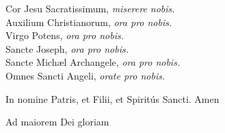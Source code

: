 \documentclass[9pt, twoside]{book}
\begin{document}
\noindent Cor Jesu Sacratissimum, \textit{miserere nobis.}\\
Auxilium Christianorum, \textit{ora pro nobis.}\\
Virgo Potens, \textit{ora pro nobis.}\\
Sancte Joseph, \textit{ora pro nobis.}\\
Sancte Michæl Archangele, \textit{ora pro nobis.}\\
Omnes Sancti Angeli, \textit{orate pro nobis.}

\noindent In nomine Patris, \cross et Filii, et Spiritús Sancti. Amen

\vfill

\noindent \centering \cross Ad maiorem Dei gloriam \cross
\end{document}
